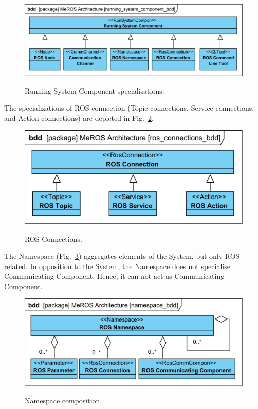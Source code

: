 \documentclass[11pt,oneside,a4paper]{report}
\begin{document}
	\begin{figure}[H]
		\centering
		\begin{center}
			{\includegraphics[scale=1.0]{diagrams/running_system_component_bdd.png}}
		\end{center}
		\caption{Running System Component specialisations.} 
		\label{fig:running_system_component_bdd}
	\end{figure} 
	 	  
	 	 
	 The specializations of ROS connection (Topic connections, Service connections, and Action connections) are depicted in Fig.~\ref{fig:ros_connections_bdd}. 
	
	
	\begin{figure}[H]
		\centering
		\begin{center}
			{\includegraphics[scale=1.0]{diagrams/ros_connections_bdd.png}}
		\end{center}
		\caption{ROS Connections.} 
		\label{fig:ros_connections_bdd}
	\end{figure}

	
	The Namespace (Fig.~\ref{fig:namespace_bdd}) aggregates elements of the System, but only ROS related. In opposition to the System, the Namespace does not specialise Communicating Component. Hence, it can not act as Communicating Component.
	
	
	\begin{figure}[H]
		\centering
		\begin{center}
			{\includegraphics[scale=1.0]{diagrams/namespace_bdd.png}}
		\end{center}
		\caption{Namespace composition.}
		\label{fig:namespace_bdd}
	\end{figure}
	
\end{document}
